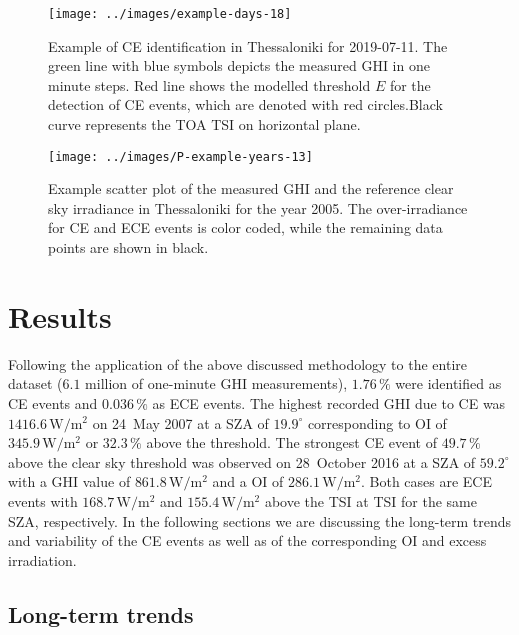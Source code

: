 \documentclass[preprint, 5p,
authoryear]{elsarticle} %
\begin{document}
\begin{figure}[H]

{\centering \texttt{[image: ../images/example-days-18]} 

}

\caption{Example of CE identification in Thessaloniki for 2019-07-11. The green line with blue symbols depicts the measured GHI in one minute steps. Red line shows the modelled threshold $E$ for the detection of CE events, which are denoted with red circles.Black curve represents the TOA TSI on horizontal plane.}\label{fig:example-day}
\end{figure}

\begin{figure}[H]

{\centering \texttt{[image: ../images/P-example-years-13]} 

}

\caption{Example scatter plot of the measured GHI and the reference clear sky irradiance in Thessaloniki for the year 2005. The over-irradiance for CE and ECE events is color coded, while the remaining data points are shown in black.}\label{fig:example-year}
\end{figure}

\hypertarget{results}{%
\section{Results}\label{results}}

Following the application of the above discussed methodology to the
entire dataset (\(6.1\) million of one-minute GHI measurements),
\(1.76\,\%\) were identified as CE events and \(0.036\,\%\) as ECE
events. The highest recorded GHI due to CE was
\(1416.6\,\text{W}/\text{m}^2\) on 24~May 2007 at a SZA of
\(19.9^\circ\) corresponding to OI of \(345.9\,\text{W}/\text{m}^2\) or
\(32.3\,\%\) above the threshold. The strongest CE event of \(49.7\,\%\)
above the clear sky threshold was observed on 28~October 2016 at a SZA
of \(59.2^\circ\) with a GHI value of \(861.8\,\text{W}/\text{m}^2\) and
a OI of \(286.1\,\text{W}/\text{m}^2\). Both cases are ECE events with
\(168.7\,\text{W}/\text{m}^2\) and \(155.4\,\text{W}/\text{m}^2\) above
the TSI at TSI for the same SZA, respectively. In the following sections
we are discussing the long-term trends and variability of the CE events
as well as of the corresponding OI and excess irradiation.

\hypertarget{long-term-trends}{%
\subsection{Long-term trends}\label{long-term-trends}}
\end{document}
